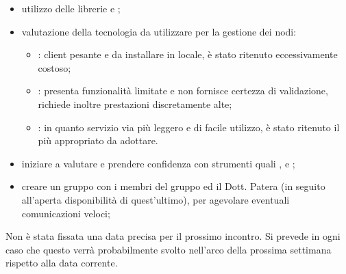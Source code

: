 
\begin{itemize}
    \item utilizzo delle librerie  e ;
    \item valutazione della tecnologia da utilizzare per la gestione dei nodi:
        \begin{itemize}
            \item {}: client pesante e da installare in locale, è stato ritenuto eccessivamente costoso;
            \item {}: presenta funzionalità limitate e non fornisce certezza di validazione, richiede inoltre prestazioni discretamente alte;
            \item {}: in quanto servizio via  più leggero e di facile utilizzo, è stato ritenuto il più appropriato da adottare.
        \end{itemize}
    \item iniziare a valutare e prendere confidenza con strumenti quali ,  e ;
    \item creare un gruppo  con i membri del gruppo ed il Dott. Patera (in seguito all'aperta disponibilità di quest'ultimo), per agevolare eventuali comunicazioni veloci;
\end{itemize}

Non è stata fissata una data precisa per il prossimo incontro. Si prevede in ogni caso che questo verrà probabilmente svolto nell'arco della prossima settimana rispetto alla data corrente.
